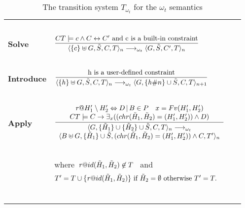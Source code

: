 \documentclass[final]{acmtrans2e}
\newcommand{\la}{\langle}
\newcommand{\ra}{\rangle}
\newcommand{\rrarrow}{\longrightarrow}
\begin{document}
\begin{table*}[tbp]
\caption{The transition  system $T_{\omega_t}$ for the $\omega_t$ semantics}
\centering
\label{omega-t}


\begin{tabular}{lll}
\hline\noalign{\smallskip}
&\mbox{   }&\mbox{   }
\\
\mbox{\bf Solve} &  $\displaystyle{\frac {CT \models
c \wedge C \leftrightarrow C' \hbox{ and c is a built-in
constraint}}  {\la \{c\}\uplus G, \tilde S,C, T \ra_n
\rrarrow_{\omega_t} \la G, \tilde S,C', T \ra_n}} $



&\mbox{ }
\\
&\mbox{   }&\mbox{   }
\\

\mbox{\bf Introduce}& $\displaystyle{\frac { \hbox{h
is a user-defined constraint}}{ \la \{h \}\uplus G, \tilde S,C, T
\ra_n \rrarrow_{\omega_t} \la G,\{ h\#n \} \cup \tilde S ,C, T
\ra_{n+1} }}$ &\mbox{ }
\\
&\mbox{   }&\mbox{   }
\\

\mbox{\bf Apply}& $\displaystyle{\frac {
\begin{array}{c}
{\it r}@H'_1 \setminus H'_2 \Leftrightarrow D  \,|\,  B \in P \ \ \
x = Fv(H'_1, H'_2)  \\
CT \models C \rightarrow \exists _{x}
((chr(\tilde H_1, \tilde H_2)=(H'_1,  H'_2))\wedge D)
\end{array}
}
{\displaystyle
\begin{array}{c}
\la G, \{\tilde H_1\} \cup \{ \tilde H_2\}\cup
\tilde S,C, T \ra_n \rrarrow_{\omega_t}\\ \la B\uplus G,\{ \tilde
H_1\} \cup \tilde S, (chr(\tilde H_1, \tilde H_2)=(H'_1,
H'_2))\wedge C, T' \ra_n
\end{array} }}$&\mbox{ }
\\
&\mbox{   }&\mbox{   }
\\
&\mbox{where }${\it r}@id (\tilde  H_1,  \tilde H_2) \not \in T $
\mbox{ and }\\
&$T'=T \cup \{{\it r}@id ( \tilde H_1,  \tilde H_2)\}
\mbox{ if } \tilde H_2=\emptyset \mbox{ otherwise } T'=T. $&\mbox{
}
\\
&\mbox{   }&\mbox{   }
\\
\noalign{\smallskip}\hline
\end{tabular}
\end{table*}
\end{document}
